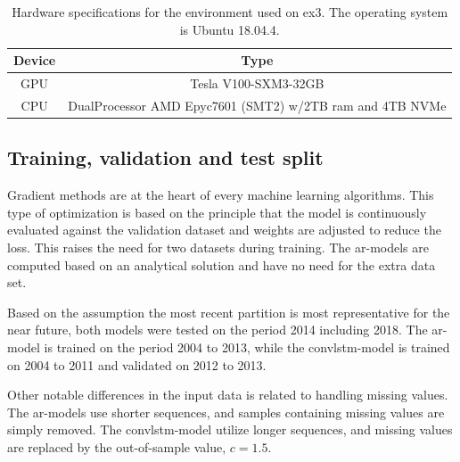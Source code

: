 \begin{table}[ht]
    \centering
    \begin{tabular}{c|c}
        Device &  Type  \\ \hline
        GPU & Tesla V100-SXM3-32GB \\
        CPU & DualProcessor AMD Epyc7601 (SMT2) w/2TB ram and 4TB NVMe 
    \end{tabular}
    \caption{Hardware specifications for the environment used on \acrshort{ex3}. The operating system is Ubuntu 18.04.4.}
    \label{tab:hardware_ex3}
\end{table}


\subsection{Training, validation and test split}
Gradient methods are at the heart of every machine 
learning algorithms. This type of optimization is based on the principle that the model is continuously evaluated against the validation dataset and weights are adjusted to reduce the loss. This raises the need for two datasets during training. The \acrshort{ar}-models are computed based on an analytical solution and have no need for the extra data set. 

Based on the assumption the most recent partition is most representative for the near future, both models were tested on the period 2014 including 2018. The \acrshort{ar}-model is trained on the period 2004 to 2013, while the \acrshort{convlstm}-model is trained on 2004 to 2011 and validated on 2012 to 2013.

Other notable differences in the input data is related to handling missing values. The \acrshort{ar}-models use shorter sequences, and samples containing missing values are simply removed. The \acrshort{convlstm}-model utilize longer sequences, and missing values are replaced by the out-of-sample value, $c=1.5$. 

